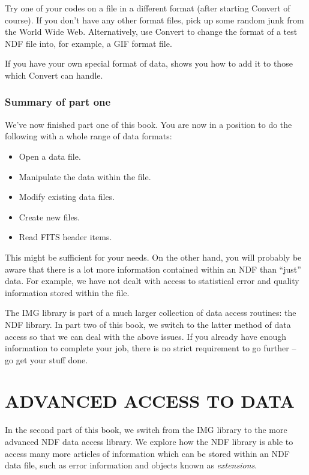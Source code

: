 \documentclass[11pt,nolof]{starlink}
\begin{document}
Try one of your codes on a file in a different format (after starting
Convert of course). If you don't have any other format files, pick up some
random junk from the World Wide Web. Alternatively, use Convert to change
the format of a test NDF file into, for example, a GIF format file.

If you have your own special format of data, 
shows you how to add it to those which Convert can handle.

\section{Summary of part one}

We've now finished part one of this book. You are now in a position
to do the following with a whole range of data formats:

\begin{itemize}
\item Open a data file.
\item Manipulate the data within the file.
\item Modify existing data files.
\item Create new files.
\item Read FITS header items.
\end{itemize}

This might be sufficient for your needs. On the other hand, you will
probably be aware that there is a lot more information contained within an
NDF than ``just'' data. For example, we have not dealt with access to
statistical error and quality information stored within the file.

The IMG library is part of a much larger collection of data access routines:
the NDF library. In part two of this book, we switch to the latter method
of data access so that we can deal with the above issues. If you already have
enough information to complete your job, there is no strict requirement
to go further -- go get your stuff done.

\newpage

\part{ADVANCED ACCESS TO DATA}



In the second part of this book, we switch from the IMG library to the
more advanced NDF data access library. We explore how the NDF library
is able to access many more articles of information which can be
stored within an NDF data file, such as error information and
objects known as \emph{extensions}.
\end{document}
